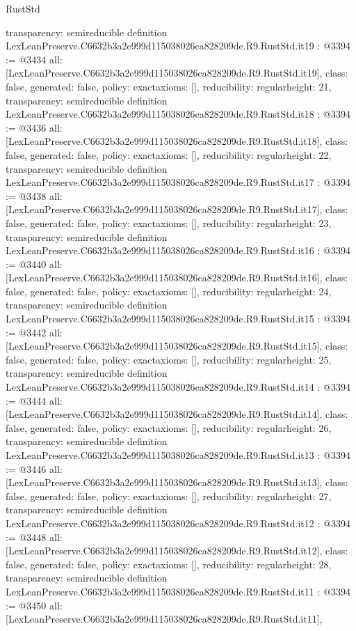 \begin{lexlean}{RustStd}
\begin{coremodule}
{  transparency: semireducible
}
definition LexLeanPreserve.C6632b3a2e999d115038026ca828209de.R9.RustStd.it19 : @3394 := @3434 {
  all: [LexLeanPreserve.C6632b3a2e999d115038026ca828209de.R9.RustStd.it19],
  class: false,
  generated: false,
  policy: exact{axioms: []},
  reducibility: regular{height: 21},
  transparency: semireducible
}
definition LexLeanPreserve.C6632b3a2e999d115038026ca828209de.R9.RustStd.it18 : @3394 := @3436 {
  all: [LexLeanPreserve.C6632b3a2e999d115038026ca828209de.R9.RustStd.it18],
  class: false,
  generated: false,
  policy: exact{axioms: []},
  reducibility: regular{height: 22},
  transparency: semireducible
}
definition LexLeanPreserve.C6632b3a2e999d115038026ca828209de.R9.RustStd.it17 : @3394 := @3438 {
  all: [LexLeanPreserve.C6632b3a2e999d115038026ca828209de.R9.RustStd.it17],
  class: false,
  generated: false,
  policy: exact{axioms: []},
  reducibility: regular{height: 23},
  transparency: semireducible
}
definition LexLeanPreserve.C6632b3a2e999d115038026ca828209de.R9.RustStd.it16 : @3394 := @3440 {
  all: [LexLeanPreserve.C6632b3a2e999d115038026ca828209de.R9.RustStd.it16],
  class: false,
  generated: false,
  policy: exact{axioms: []},
  reducibility: regular{height: 24},
  transparency: semireducible
}
definition LexLeanPreserve.C6632b3a2e999d115038026ca828209de.R9.RustStd.it15 : @3394 := @3442 {
  all: [LexLeanPreserve.C6632b3a2e999d115038026ca828209de.R9.RustStd.it15],
  class: false,
  generated: false,
  policy: exact{axioms: []},
  reducibility: regular{height: 25},
  transparency: semireducible
}
definition LexLeanPreserve.C6632b3a2e999d115038026ca828209de.R9.RustStd.it14 : @3394 := @3444 {
  all: [LexLeanPreserve.C6632b3a2e999d115038026ca828209de.R9.RustStd.it14],
  class: false,
  generated: false,
  policy: exact{axioms: []},
  reducibility: regular{height: 26},
  transparency: semireducible
}
definition LexLeanPreserve.C6632b3a2e999d115038026ca828209de.R9.RustStd.it13 : @3394 := @3446 {
  all: [LexLeanPreserve.C6632b3a2e999d115038026ca828209de.R9.RustStd.it13],
  class: false,
  generated: false,
  policy: exact{axioms: []},
  reducibility: regular{height: 27},
  transparency: semireducible
}
definition LexLeanPreserve.C6632b3a2e999d115038026ca828209de.R9.RustStd.it12 : @3394 := @3448 {
  all: [LexLeanPreserve.C6632b3a2e999d115038026ca828209de.R9.RustStd.it12],
  class: false,
  generated: false,
  policy: exact{axioms: []},
  reducibility: regular{height: 28},
  transparency: semireducible
}
definition LexLeanPreserve.C6632b3a2e999d115038026ca828209de.R9.RustStd.it11 : @3394 := @3450 {
  all: [LexLeanPreserve.C6632b3a2e999d115038026ca828209de.R9.RustStd.it11],
}
\end{coremodule}
\end{lexlean}
